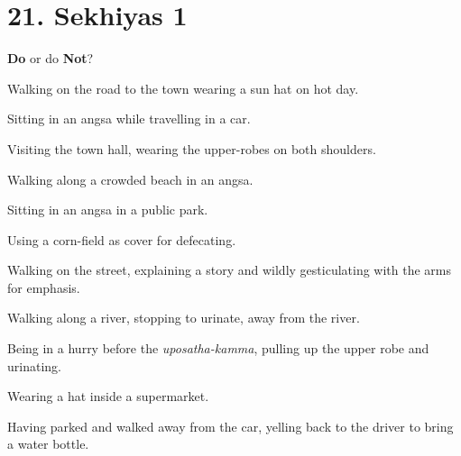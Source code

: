 \chapter{21. Sekhiyas 1}
\renewcommand*{\theChapterTitle}{21. Sekhiyas 1}

\begin{exam}{\autoExamName}

  \begin{problem*}
    \textbf{Do} or do \textbf{Not}?

    \bigskip

    \begin{parts}

    \item {} Walking on the road to the town wearing a sun hat on hot day.

    \bigskip

    \item {} Sitting in an angsa while travelling in a car.

    \bigskip

    \item {} Visiting the town hall, wearing the upper-robes on both shoulders.

    \bigskip

    \item {} Walking along a crowded beach in an angsa.

    \bigskip

    \item {} Sitting in an angsa in a public park.

    \bigskip

    \item {} Using a corn-field as cover for defecating.

    \bigskip

    \item {} Walking on the street, explaining a story and wildly gesticulating with the arms for emphasis.

    \bigskip

    \item {} Walking along a river, stopping to urinate, away from the river.

    \bigskip

    \item {} Being in a hurry before the \emph{uposatha-kamma}, pulling up the upper robe and urinating.

    \bigskip

    \item {} Wearing a hat inside a supermarket.

    \bigskip

    \item {} Having parked and walked away from the car, yelling back to the driver to bring a water bottle.

    \end{parts}

  \end{problem*}

\end{exam}
